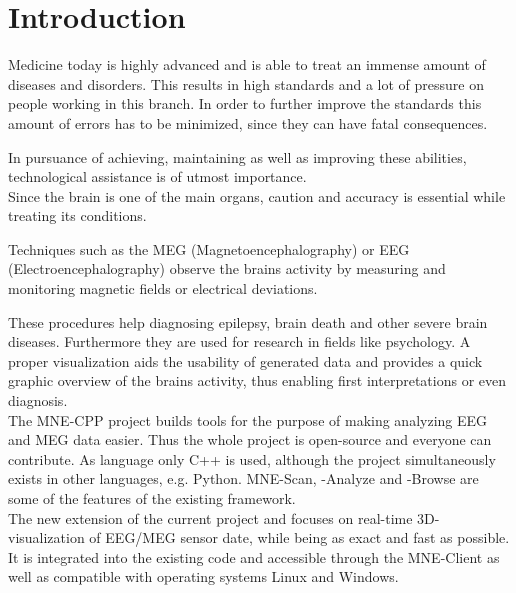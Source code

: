 
\section{Introduction}

	Medicine today is highly advanced and is able to treat an immense amount of diseases and disorders.
	This results in high standards and a lot of pressure on people working in this branch. In order to further improve the 			standards this amount of errors has to be minimized, since they can have fatal consequences.

	In pursuance of achieving, maintaining as well as improving these abilities, technological assistance is of utmost 				importance.\\  

	Since the brain is one of the main organs, caution and accuracy is essential while treating its conditions. 
	
	Techniques such as the MEG (Magnetoencephalography) or EEG (Electroencephalography) observe the brains activity by 				measuring and monitoring magnetic fields or electrical deviations.

	These procedures help diagnosing epilepsy, brain death and other severe brain diseases.
	Furthermore they are used for research in fields like psychology.
	A proper visualization aids the usability of generated data and provides a quick graphic overview of the brains activity, thus enabling first interpretations or even diagnosis.\\
	

	The MNE-CPP  project builds tools for the purpose of making analyzing EEG and MEG data easier.
	Thus the whole project is open-source and everyone can contribute. As language only C++ is used, although the project 			simultaneously exists in other languages, e.g. Python. %
	MNE-Scan, -Analyze and -Browse are some of the features of the existing framework. \\

	The new extension of the current project and focuses on real-time 3D-visualization of EEG/MEG sensor date, while being as 		exact and fast as possible. It is integrated into the existing code and accessible through the MNE-Client as well as 			compatible with operating systems Linux and Windows.
  
